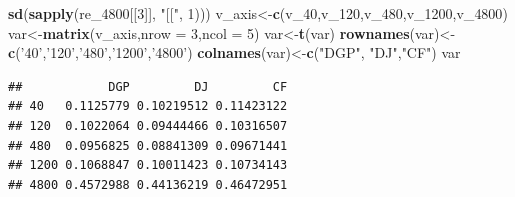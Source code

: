 \documentclass[
]{article}
\newenvironment{Shaded}{\begin{snugshade}}{\end{snugshade}}
\newcommand{\DataTypeTok}[1]{\textcolor[rgb]{0.13,0.29,0.53}{#1}}
\newcommand{\DecValTok}[1]{\textcolor[rgb]{0.00,0.00,0.81}{#1}}
\newcommand{\KeywordTok}[1]{\textcolor[rgb]{0.13,0.29,0.53}{\textbf{#1}}}
\newcommand{\NormalTok}[1]{#1}
\newcommand{\StringTok}[1]{\textcolor[rgb]{0.31,0.60,0.02}{#1}}
\begin{document}
\begin{Shaded}
\begin{Highlighting}[]
        \KeywordTok{sd}\NormalTok{(}\KeywordTok{sapply}\NormalTok{(re_}\DecValTok{4800}\NormalTok{[[}\DecValTok{3}\NormalTok{]], }\StringTok{"[["}\NormalTok{, }\DecValTok{1}\NormalTok{)))}
\NormalTok{v_axis<-}\KeywordTok{c}\NormalTok{(v_}\DecValTok{40}\NormalTok{,v_}\DecValTok{120}\NormalTok{,v_}\DecValTok{480}\NormalTok{,v_}\DecValTok{1200}\NormalTok{,v_}\DecValTok{4800}\NormalTok{)}
\NormalTok{var<-}\KeywordTok{matrix}\NormalTok{(v_axis,}\DataTypeTok{nrow =} \DecValTok{3}\NormalTok{,}\DataTypeTok{ncol =} \DecValTok{5}\NormalTok{)}
\NormalTok{var<-}\KeywordTok{t}\NormalTok{(var)}
\KeywordTok{rownames}\NormalTok{(var)<-}\KeywordTok{c}\NormalTok{(}\StringTok{'40'}\NormalTok{,}\StringTok{'120'}\NormalTok{,}\StringTok{'480'}\NormalTok{,}\StringTok{'1200'}\NormalTok{,}\StringTok{'4800'}\NormalTok{)}
\KeywordTok{colnames}\NormalTok{(var)<-}\KeywordTok{c}\NormalTok{(}\StringTok{"DGP"}\NormalTok{, }\StringTok{"DJ"}\NormalTok{,}\StringTok{"CF"}\NormalTok{)}
\NormalTok{var}
\end{Highlighting}
\end{Shaded}

\begin{verbatim}
##            DGP         DJ         CF
## 40   0.1125779 0.10219512 0.11423122
## 120  0.1022064 0.09444466 0.10316507
## 480  0.0956825 0.08841309 0.09671441
## 1200 0.1068847 0.10011423 0.10734143
## 4800 0.4572988 0.44136219 0.46472951
\end{verbatim}
\end{document}
